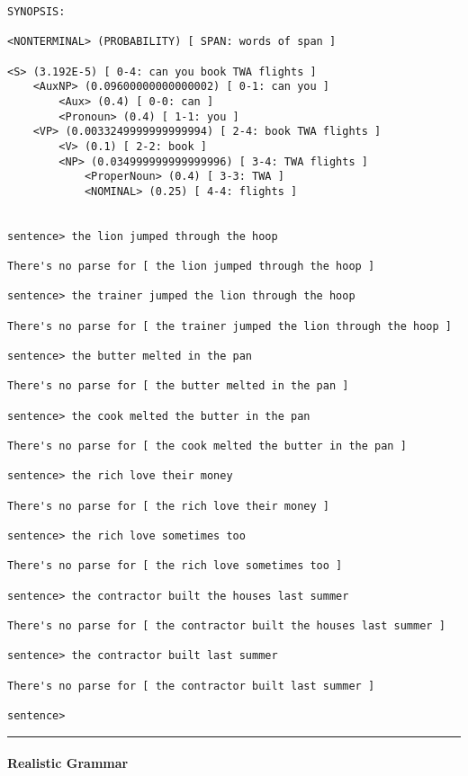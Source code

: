 \begin{verbatim}
SYNOPSIS:

<NONTERMINAL> (PROBABILITY) [ SPAN: words of span ]

<S> (3.192E-5) [ 0-4: can you book TWA flights ]
    <AuxNP> (0.09600000000000002) [ 0-1: can you ]
        <Aux> (0.4) [ 0-0: can ]
        <Pronoun> (0.4) [ 1-1: you ]
    <VP> (0.0033249999999999994) [ 2-4: book TWA flights ]
        <V> (0.1) [ 2-2: book ]
        <NP> (0.034999999999999996) [ 3-4: TWA flights ]
            <ProperNoun> (0.4) [ 3-3: TWA ]
            <NOMINAL> (0.25) [ 4-4: flights ]


sentence> the lion jumped through the hoop

There's no parse for [ the lion jumped through the hoop ]

sentence> the trainer jumped the lion through the hoop

There's no parse for [ the trainer jumped the lion through the hoop ]

sentence> the butter melted in the pan

There's no parse for [ the butter melted in the pan ]

sentence> the cook melted the butter in the pan

There's no parse for [ the cook melted the butter in the pan ]

sentence> the rich love their money

There's no parse for [ the rich love their money ]

sentence> the rich love sometimes too

There's no parse for [ the rich love sometimes too ]

sentence> the contractor built the houses last summer

There's no parse for [ the contractor built the houses last summer ]

sentence> the contractor built last summer

There's no parse for [ the contractor built last summer ]

sentence>
\end{verbatim}
\vskip4pt\hrule

\paragraph{Realistic Grammar}

